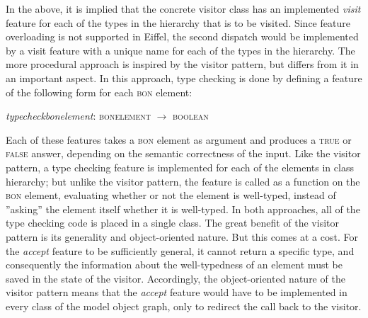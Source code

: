 In the above, it is implied that the concrete visitor class has an implemented \textit{visit} feature for each of the types in the hierarchy that is to be visited. Since feature overloading is not supported in Eiffel, the second dispatch would be implemented by a visit feature with a unique name for each of the types in the hierarchy.
The more procedural approach is inspired by the visitor pattern, but differs from it in an important aspect. In this approach, type checking is done by defining a feature of the following form for each \textsc{bon} element:
\begin{center}
\textit{type}\textunderscore\textit{check}\textunderscore\textit{bon}\textunderscore\textit{element}: \textsc{bon}\textunderscore\textsc{element} $\rightarrow$  \textsc{boolean}\\
\end{center}
Each of these features takes a \textsc{bon} element as argument and produces a \textsc{true} or \textsc{false} answer, depending on the semantic correctness of the input. Like the visitor pattern, a type checking feature is implemented for each of the elements in class hierarchy; but unlike the visitor pattern, the feature is called as a function on the \textsc{bon} element, evaluating whether or not the element is well-typed, instead of ''asking'' the element itself whether it is well-typed.
In both approaches, all of the type checking code is placed in a single class. The great benefit of the visitor pattern is its generality and object-oriented nature. But this comes at a cost. For the \textit{accept} feature to be sufficiently general, it cannot return a specific type, and consequently the information about the well-typedness of an element must be saved in the state of the visitor. Accordingly, the object-oriented nature of the visitor pattern means that the \textit{accept} feature would have to be implemented in every class of the model object graph, only to redirect the call back to the visitor.
